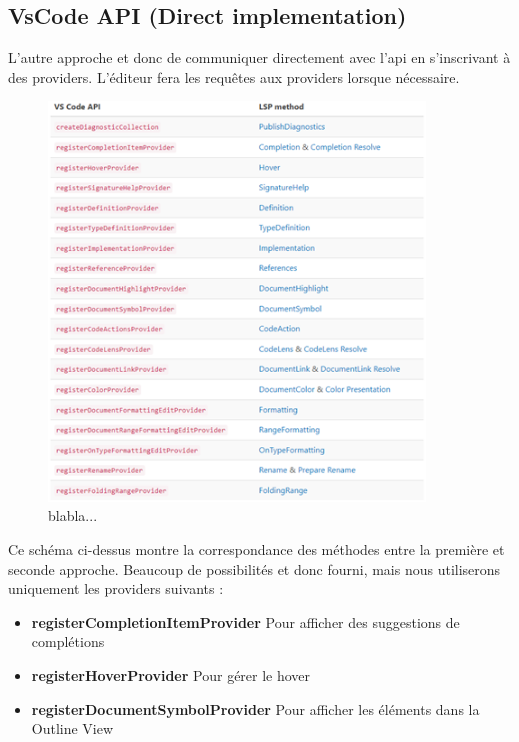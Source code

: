 \documentclass[
    iict, %
    il, %
]{heig-tb}
\begin{document}
\subsection{VsCode API (Direct implementation)}
L’autre approche et donc de communiquer directement avec l’api en s’inscrivant à des providers.
L’éditeur fera les requêtes aux providers lorsque nécessaire.

\begin{figure}[!ht]
    \begin{center}
        \includegraphics[width=10cm]{assets/figures/api-vscode.png}
    \end{center}
    \caption[API]{\label{test} blabla...}
\end{figure}

Ce schéma ci-dessus montre la correspondance des méthodes entre la première et seconde approche.
Beaucoup de possibilités et donc fourni, mais nous utiliserons uniquement les providers suivants :

\begin{itemize}
    \item \textbf{registerCompletionItemProvider}
          \subitem Pour afficher des suggestions de complétions
    \item \textbf{registerHoverProvider}
          \subitem Pour gérer le hover
    \item \textbf{registerDocumentSymbolProvider}
          \subitem Pour afficher les éléments dans la Outline View
\end{itemize}
\end{document}
